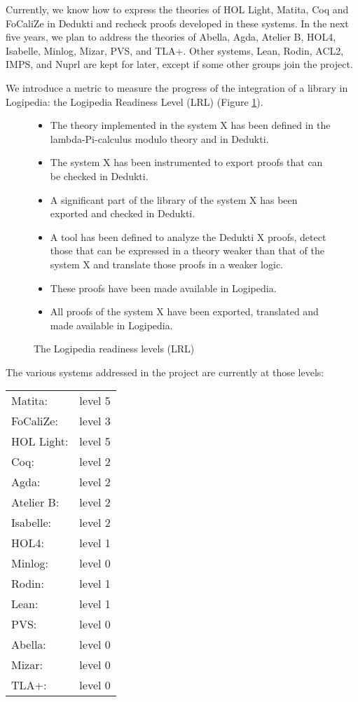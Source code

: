 Currently, we know how to express the theories of {\sc HOL Light},
{\sc Matita}, {\sc Coq} and {\sc FoCaliZe} in {\sc Dedukti} and recheck proofs
developed in these systems. In the next five years, we plan to address
the theories of {\sc Abella}, {\sc Agda}, {\sc Atelier B},
{\sc HOL4}, {\sc Isabelle}, {\sc Minlog}, {\sc Mizar},
{\sc PVS}, and {\sc TLA+}. Other systems, {\sc Lean}, {\sc Rodin}, {\sc ACL2},
{\sc IMPS}, and {\sc Nuprl} are kept for later, except if some other
groups join the project.

We introduce a metric to measure the progress of the
integration of a library in Logipedia: the Logipedia Readiness Level (LRL) (Figure \ref{lrl}).

\begin{figure}[ht]
\begin{itemize}
\item[LRL level 1:]
The theory implemented in the system X has been defined in
the lambda-Pi-calculus modulo theory and in Dedukti.

\item[LRL level 2:]
The system X has been instrumented to export proofs that
can be checked in Dedukti.

\item[LRL level 3:]
A significant part of the library of the system X has been exported and checked in Dedukti.

\item[LRL level 4:]
A tool has been defined to analyze the Dedukti X proofs,
detect those that can be expressed in a theory weaker than that of the
system X and translate those proofs in a weaker logic.

\item[LRL level 5:]
These proofs have been made available in Logipedia.

\item[LRL level 6:]
All proofs of the system X have been exported, translated
and made available in Logipedia.
\end{itemize}
\caption{The Logipedia readiness levels (LRL)\label{lrl}}
\end{figure}

The various systems addressed in the project are currently at those levels:

\begin{tabular}{ll}
Matita:& level 5\\
FoCaliZe:& level 3\\
HOL Light:& level 5\\
Coq:& level 2\\
Agda:& level 2\\
Atelier B:& level 2\\
Isabelle:& level 2\\
HOL4:& level 1\\
Minlog:& level 0\\
Rodin:& level 1\\
Lean:& level 1\\
PVS:& level 0\\
Abella:& level 0\\
Mizar:& level 0\\
TLA+:& level 0
\end{tabular}

